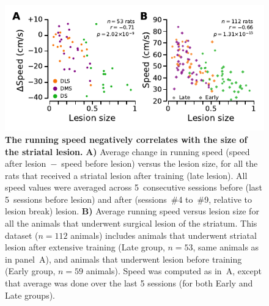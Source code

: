 \begin{figure}[h!]
    \begin{center}
        \includegraphics[scale=1]{ch-appendicies/figures/Speed.pdf}
        \caption[Speed-Lesion Size Correlation]
        {\textbf{The running speed negatively correlates with the size of the striatal lesion.}
        \textbf{A)}
        Average change in running speed (speed after lesion~$-$~speed before lesion) versus the lesion size, for all the rats that received a striatal lesion after training (late lesion).
        All speed values were averaged across 5~consecutive sessions before (last 5~sessions before lesion) and after (sessions~\#4 to~\#9, relative to lesion break) lesion.
        \textbf{B)}
        Average running speed versus lesion size for all the animals that underwent surgical lesion of the striatum.
        This dataset ($n=112$ animals) includes animals that underwent striatal lesion after extensive training (Late group, $n=53$, same animals as in panel~A), and animals that underwent lesion before training (Early group, $n=59$ animals).
        Speed was computed as in~A, except that average was done over the last 5 sessions (for both Early and Late groups).
        }
        \label{fig:appendix:spd}
    \end{center}
\end{figure}